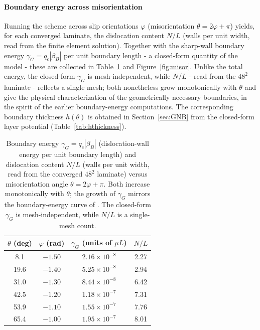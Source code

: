 \documentclass[12pt]{article}
\theoremstyle{plain}
\theoremstyle{definition}
\begin{document}
\paragraph{Boundary energy across misorientation}
Running the scheme across slip orientations $\varphi$ (misorientation
$\theta=2\varphi+\pi$) yields, for each converged laminate, the dislocation
content $N/L$ (walls per unit width, read from the finite element solution).
Together with the sharp-wall boundary energy $\gamma_G=q_c|\beta_B|$ per unit
boundary length - a closed-form quantity of the model - these are collected in
Table~\ref{tab:misor} and Figure~\ref{fig:misor}. Unlike the total energy, the
closed-form $\gamma_G$ is mesh-independent, while $N/L$ - read from the $48^2$
laminate - reflects a single mesh; both nonetheless grow monotonically with
$\theta$ and give the physical characterization of the geometrically necessary
boundaries, in the spirit of the earlier boundary-energy
computations. The corresponding boundary thickness $h(\theta)$ is
obtained in Section~\ref{sec:GNB} from the closed-form layer potential
(Table~\ref{tab:hthickness}).

\begin{table}[h]\centering\small
\begin{tabular}{@{}cccc@{}}
\toprule
$\theta$ (deg) & $\varphi$ (rad) & $\gamma_G$ (units of $\mu L$) & $N/L$ \\
\midrule
 8.1 & $-1.50$ & $2.16\times10^{-8}$ & 2.27 \\
19.6 & $-1.40$ & $5.25\times10^{-8}$ & 2.94 \\
31.0 & $-1.30$ & $8.44\times10^{-8}$ & 6.42 \\
42.5 & $-1.20$ & $1.18\times10^{-7}$ & 7.31 \\
53.9 & $-1.10$ & $1.55\times10^{-7}$ & 7.76 \\
65.4 & $-1.00$ & $1.95\times10^{-7}$ & 8.01 \\
\bottomrule
\end{tabular}
\caption{Boundary energy $\gamma_G=q_c|\beta_B|$ (dislocation-wall energy per unit boundary length) and dislocation content $N/L$ (walls per unit width, read from
the converged $48^2$ laminate) versus misorientation angle
$\theta=2\varphi+\pi$. Both increase monotonically with $\theta$; the growth of
$\gamma_G$ mirrors the boundary-energy curve of
\citet{koster2015bformation}. The closed-form $\gamma_G$ is mesh-independent,
while $N/L$ is a single-mesh count.}
\label{tab:misor}
\end{table}
\end{document}
